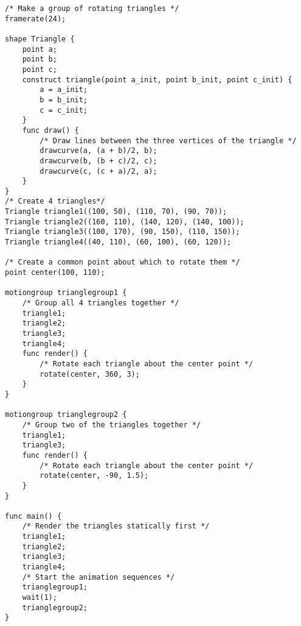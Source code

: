 \documentclass[letterpaper,12pt]{article}
\begin{document}
\begin{lstlisting}
/* Make a group of rotating triangles */
framerate(24);

shape Triangle {
	point a;
	point b;
	point c;
	construct triangle(point a_init, point b_init, point c_init) {
		a = a_init;
		b = b_init;
		c = c_init;
	}
	func draw() {
		/* Draw lines between the three vertices of the triangle */
		drawcurve(a, (a + b)/2, b);
		drawcurve(b, (b + c)/2, c);
		drawcurve(c, (c + a)/2, a);
	}
}
/* Create 4 triangles*/
Triangle triangle1((100, 50), (110, 70), (90, 70));
Triangle triangle2((160, 110), (140, 120), (140, 100));
Triangle triangle3((100, 170), (90, 150), (110, 150));
Triangle triangle4((40, 110), (60, 100), (60, 120));

/* Create a common point about which to rotate them */
point center(100, 110);

motiongroup trianglegroup1 {
	/* Group all 4 triangles together */
	triangle1;
	triangle2;
	triangle3;
	triangle4;
	func render() {
		/* Rotate each triangle about the center point */
		rotate(center, 360, 3);
	}
}

motiongroup trianglegroup2 {
	/* Group two of the triangles together */
	triangle1;
	triangle3;
	func render() {
		/* Rotate each triangle about the center point */
		rotate(center, -90, 1.5);
	}
}

func main() {
	/* Render the triangles statically first */
	triangle1;
	triangle2;
	triangle3;
	triangle4;
	/* Start the animation sequences */
	trianglegroup1;
	wait(1);
	trianglegroup2;
}
\end{lstlisting}
\end{document}
